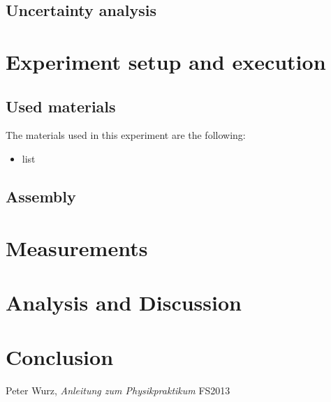 \documentclass{scrreprt}
\begin{document}
\subsection{Uncertainty analysis}

\section{Experiment setup and execution}

\subsection{Used materials}
The materials used in this experiment are the following:
\begin{itemize}
\item list
\end{itemize}

\subsection{Assembly}

\section{Measurements}

\section{Analysis and Discussion}

\section{Conclusion}

\begin{thebibliography}{9}

  Peter Wurz,
  \emph{Anleitung zum Physikpraktikum}
  FS2013

\end{thebibliography}
\end{document}
